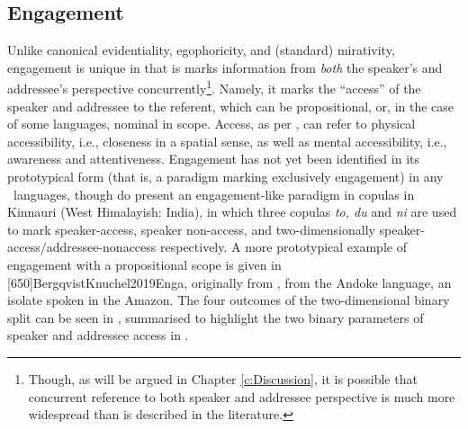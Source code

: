 \subsection{Engagement}\label{s:Intro:EngagementIntro}
Unlike canonical evidentiality, egophoricity, and (standard) mirativity, engagement is unique in that is marks information from \textit{both} the speaker's and addressee's perspective concurrently\footnote{Though, as will be argued in Chapter \ref{c:Discussion}, it is possible that concurrent reference to both speaker and addressee perspective is much more widespread than is described in the literature.}. Namely, it marks the ``access'' \cite[118]{EvansBergqvistSanRoque2018a} of the speaker and addressee to the referent, which can be propositional, or, in the case of some languages, nominal in scope. Access, as per , can refer to physical accessibility, i.e., closeness in a spatial sense, as well as mental accessibility, i.e., awareness and attentiveness. Engagement has not yet been identified in its prototypical form (that is, a paradigm marking exclusively engagement) in any \lfam\ languages, though  do present an engagement-like paradigm in copulas in Kinnauri (West Himalayish: India), in which three copulas \textit{to, du} and \textit{ni} are used to mark speaker-access, speaker non-access, and two-dimensionally speaker-access/addressee-nonaccess respectively. A more prototypical example of engagement with a propositional scope is given in [650]{BergqvistKnuchel2019Enga}, originally from , from the Andoke language, an isolate spoken in the Amazon. The four outcomes of the two-dimensional binary split can be seen in , summarised to highlight the two binary parameters of speaker and addressee access in .

